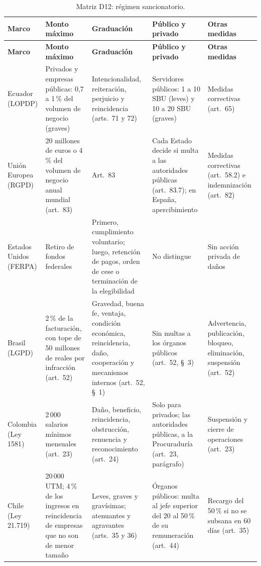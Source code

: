 {\scriptsize
\renewcommand{\arraystretch}{1.12}
\begin{xltabular}{\textwidth}{|>{\raggedright\arraybackslash}p{2.0cm}|L|L|L|L|}
  \caption{Matriz D12: régimen sancionatorio.}
  \label{tab:matriz_d12} \\
  \hline
  \textbf{Marco} & \textbf{Monto máximo} & \textbf{Graduación} & \textbf{Público y privado} & \textbf{Otras medidas} \\
  \hline
  \endfirsthead
  \hline
  \textbf{Marco} & \textbf{Monto máximo} & \textbf{Graduación} & \textbf{Público y privado} & \textbf{Otras medidas} \\
  \hline
  \endhead
  \hline
  \endlastfoot
  Ecuador (LOPDP) & Privados y empresas públicas: 0,7 a 1\,\% del volumen de negocio (graves) & Intencionalidad, reiteración, perjuicio y reincidencia (arts.~71 y 72) & Servidores públicos: 1 a 10 SBU (leves) y 10 a 20 SBU (graves) & Medidas correctivas (art.~65) \\ \hline
  Unión Europea (RGPD) & 20 millones de euros o 4\,\% del volumen de negocio anual mundial (art.~83) \cite{rgpd2016} & Art.~83 & Cada Estado decide si multa a las autoridades públicas (art.~83.7); en España, apercibimiento \cite[art.~77]{lopdgdd2018} & Medidas correctivas (art.~58.2) e indemnización (art.~82) \\ \hline
  Estados Unidos (FERPA) & Retiro de fondos federales \cite{crs2021ferpa} & Primero, cumplimiento voluntario; luego, retención de pagos, orden de cese o terminación de la elegibilidad \cite[§~99.67]{ferpa34cfr} & No distingue & Sin acción privada de daños \\ \hline
  Brasil (LGPD) & 2\,\% de la facturación, con tope de 50 millones de reales por infracción (art.~52) \cite{brasil2018lgpd} & Gravedad, buena fe, ventaja, condición económica, reincidencia, daño, cooperación y mecanismos internos (art.~52, §~1) & Sin multas a los órganos públicos (art.~52, §~3) & Advertencia, publicación, bloqueo, eliminación, suspensión (art.~52) \\ \hline
  Colombia (Ley 1581) & 2\,000 salarios mínimos mensuales (art.~23) \cite{colombia2012ley1581} & Daño, beneficio, reincidencia, obstrucción, renuencia y reconocimiento (art.~24) & Solo para privados; las autoridades públicas, a la Procuraduría (art.~23, parágrafo) & Suspensión y cierre de operaciones (art.~23) \\ \hline
  Chile (Ley 21.719) & 20\,000 UTM; 4\,\% de los ingresos en reincidencia de empresas que no son de menor tamaño \cite{chile2024ley21719} & Leves, graves y gravísimas; atenuantes y agravantes (arts.~35 y 36) & Órganos públicos: multa al jefe superior del 20 al 50\,\% de su remuneración (art.~44) & Recargo del 50\,\% si no se subsana en 60 días (art.~35) \\ \hline
\end{xltabular}
}

